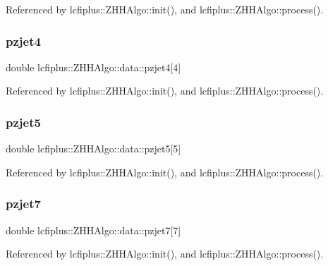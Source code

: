 Referenced by lcfiplus\+::\+Z\+H\+H\+Algo\+::init(), and lcfiplus\+::\+Z\+H\+H\+Algo\+::process().

\mbox{\label{structlcfiplus_1_1ZHHAlgo_1_1data_ab29639d0c4b2ca75ffb7170d8fd5f3c8}} 
\subsubsection{pzjet4}
{\footnotesize\ttfamily double lcfiplus\+::\+Z\+H\+H\+Algo\+::data\+::pzjet4[4]}



Referenced by lcfiplus\+::\+Z\+H\+H\+Algo\+::init(), and lcfiplus\+::\+Z\+H\+H\+Algo\+::process().

\mbox{\label{structlcfiplus_1_1ZHHAlgo_1_1data_ab805cf8d3db3abe8be2948d260aabe5a}} 
\subsubsection{pzjet5}
{\footnotesize\ttfamily double lcfiplus\+::\+Z\+H\+H\+Algo\+::data\+::pzjet5[5]}



Referenced by lcfiplus\+::\+Z\+H\+H\+Algo\+::init(), and lcfiplus\+::\+Z\+H\+H\+Algo\+::process().

\mbox{\label{structlcfiplus_1_1ZHHAlgo_1_1data_ab2a019326406d2e4053d0c0bfe20d5a9}} 
\subsubsection{pzjet7}
{\footnotesize\ttfamily double lcfiplus\+::\+Z\+H\+H\+Algo\+::data\+::pzjet7[7]}



Referenced by lcfiplus\+::\+Z\+H\+H\+Algo\+::init(), and lcfiplus\+::\+Z\+H\+H\+Algo\+::process().

\mbox{\label{structlcfiplus_1_1ZHHAlgo_1_1data_a7f07c3facb2779c86e29110651f48498}} 
